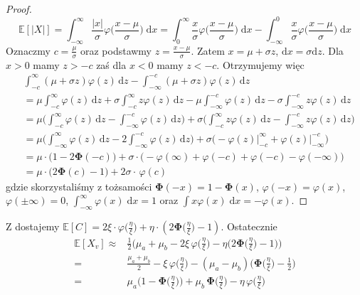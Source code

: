 \begin{proof}
\[
    \mathbb{E}[|X|]= \int_{-\infty}^{\infty} \frac{|x|}{\sigma}\varphi\Big(\frac{x-\mu}{\sigma}\Big) \; \mathrm{d}x = \int_{0}^{\infty} \frac{x}{\sigma}\varphi\Big(\frac{x-\mu}{\sigma}\Big) \; \mathrm{d}x - \int_{-\infty}^{0} \frac{x}{\sigma}\varphi\Big(\frac{x-\mu}{\sigma}\Big) \; \mathrm{d}x
\]
Oznaczmy $c=\frac{\mu}{\sigma}$ oraz podstawmy $z=\frac{x-\mu}{\sigma}$. Zatem $x=\mu+\sigma z$, $\mathrm{d}{x}=\sigma \mathrm{d}{z}$. Dla $x>0$ mamy $z>-c$ zaś dla $x<0$ mamy $z<-c$. Otrzymujemy więc
\begin{align*}
&\int_{-c}^{\infty} (\mu+\sigma z)\varphi(z)\,\mathrm{d}z 
 - \int_{-\infty}^{-c} (\mu+\sigma z)\varphi(z)\,\mathrm{d}z \\[0.3em]
&= \mu \!\int_{-c}^{\infty} \!\varphi(z)\,\mathrm{d}z
   + \sigma \!\int_{-c}^{\infty} \!z\varphi(z)\,\mathrm{d}z
   - \mu \!\int_{-\infty}^{-c} \!\varphi(z)\,\mathrm{d}z
   - \sigma \!\int_{-\infty}^{-c} \!z\varphi(z)\,\mathrm{d}z \\[0.3em]
&= \mu\!\Big(\!\int_{-c}^{\infty}\!\varphi(z)\,\mathrm{d}z 
   - \!\int_{-\infty}^{-c}\!\varphi(z)\,\mathrm{d}z\!\Big)
   + \sigma\!\Big(\!\int_{-c}^{\infty}\!z\varphi(z)\,\mathrm{d}z 
   - \!\int_{-\infty}^{-c}\!z\varphi(z)\,\mathrm{d}z\!\Big) \\[0.3em]
&= \mu\!\Big(\!\int_{-\infty}^{\infty}\!\varphi(z)\,\mathrm{d}z 
   - 2\!\int_{-\infty}^{-c}\!\varphi(z)\,\mathrm{d}z\!\Big)
   + \sigma\!\Big(-\varphi(z)\big|_{-c}^{\infty}
   + \varphi(z)\big|_{-\infty}^{-c}\Big) \\[0.3em]
&= \mu\cdot\!\Big(1 - 2\mathbf{\Phi}(-c)\Big)
   + \sigma\cdot\!\Big(-\varphi(\infty)+\varphi(-c)+\varphi(-c)-\varphi(-\infty)\Big) \\[0.3em]
&= \mu\cdot\!\Big(2\mathbf{\Phi}(c)-1\Big) + 2\sigma\cdot\,\varphi(c)
\end{align*}
gdzie skorzystaliśmy z tożsamości $\mathbf{\Phi}(-x)=1-\mathbf{\Phi}(x)$, $\varphi(-x)=\varphi(x)$, \\ $\varphi(\pm\infty)=0$, $\int_{-\infty}^{\infty}\varphi(x) \;\mathrm{d}x = 1$ oraz $\int x\varphi(x)\;\mathrm{d}x=-\varphi(x)$.
\end{proof}

Z  dostajemy $\mathbb{E}[C]=2\xi\cdot \varphi\Big(\frac{\eta}{\xi}\Big)+\eta\cdot (2\mathbf{\Phi}\Big(\frac{\eta}{\xi}\Big)-1)$. Ostatecznie 
\begin{align*}
\mathbb{E}[X_v] \approx {} &
 \tfrac{1}{2}\!\Big(\mu_a+\mu_b
 -2\xi\,\varphi\!\Big(\tfrac{\eta}{\xi}\Big)
 -\eta\!\Big(2\mathbf{\Phi}\!\Big(\tfrac{\eta}{\xi}\Big)-1\Big)\!\Big) \\[0.4em]
={} &
 \tfrac{\mu_a+\mu_b}{2}
 -\xi\,\varphi\!\Big(\tfrac{\eta}{\xi}\Big)
 -(\mu_a-\mu_b)\!\Big(\mathbf{\Phi}\!\Big(\tfrac{\eta}{\xi}\Big)-\tfrac{1}{2}\Big) \\[0.4em]
={} &
 \mu_a\!\Big(1-\mathbf{\Phi}\!\Big(\tfrac{\eta}{\xi}\Big)\Big)
 +\mu_b\,\mathbf{\Phi}\!\Big(\tfrac{\eta}{\xi}\Big)
 -\eta\,\varphi\!\Big(\tfrac{\eta}{\xi}\Big)
\end{align*}

